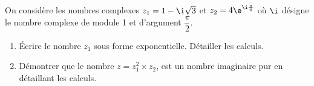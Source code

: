 \medskip

On considère les nombres complexes $z_1 = 1-\i\sqrt{3}$ et $z_2= 4\e^{\i\frac{\pi}{6}}$ où $\i$ désigne le nombre complexe de module 1 et d'argument $\dfrac{\pi}{2}$.

\begin{enumerate}
\item  Écrire le nombre $z_1$ sous forme exponentielle. Détailler les calculs.

\item Démontrer que le nombre $z = z_1^2 \times  z_2$, est un nombre imaginaire pur en détaillant les calculs.
\end{enumerate}
